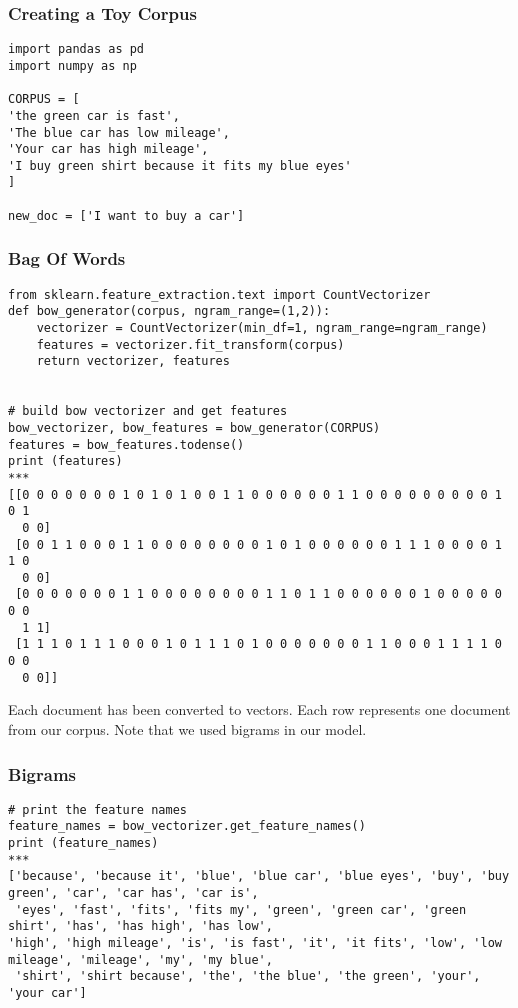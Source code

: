 \begin{frame}[fragile]\frametitle{Creating a Toy Corpus}
\begin{lstlisting}
import pandas as pd
import numpy as np

CORPUS = [
'the green car is fast',
'The blue car has low mileage',
'Your car has high mileage',
'I buy green shirt because it fits my blue eyes'
]

new_doc = ['I want to buy a car']
\end{lstlisting}
\end{frame}


\begin{frame}[fragile]\frametitle{Bag Of Words}
\begin{lstlisting}
from sklearn.feature_extraction.text import CountVectorizer
def bow_generator(corpus, ngram_range=(1,2)):
    vectorizer = CountVectorizer(min_df=1, ngram_range=ngram_range)
    features = vectorizer.fit_transform(corpus)
    return vectorizer, features


# build bow vectorizer and get features
bow_vectorizer, bow_features = bow_generator(CORPUS)
features = bow_features.todense()
print (features)
***
[[0 0 0 0 0 0 0 1 0 1 0 1 0 0 1 1 0 0 0 0 0 0 1 1 0 0 0 0 0 0 0 0 0 1 0 1
  0 0]
 [0 0 1 1 0 0 0 1 1 0 0 0 0 0 0 0 0 1 0 1 0 0 0 0 0 0 1 1 1 0 0 0 0 1 1 0
  0 0]
 [0 0 0 0 0 0 0 1 1 0 0 0 0 0 0 0 0 1 1 0 1 1 0 0 0 0 0 0 1 0 0 0 0 0 0 0
  1 1]
 [1 1 1 0 1 1 1 0 0 0 1 0 1 1 1 0 1 0 0 0 0 0 0 0 1 1 0 0 0 1 1 1 1 0 0 0
  0 0]]
\end{lstlisting}
Each document has been converted to vectors. Each row represents one document from our corpus. Note that we used bigrams in our model.
\end{frame}


\begin{frame}[fragile]\frametitle{Bigrams}
\begin{lstlisting}
# print the feature names
feature_names = bow_vectorizer.get_feature_names()
print (feature_names)
***
['because', 'because it', 'blue', 'blue car', 'blue eyes', 'buy', 'buy green', 'car', 'car has', 'car is',
 'eyes', 'fast', 'fits', 'fits my', 'green', 'green car', 'green shirt', 'has', 'has high', 'has low', 
'high', 'high mileage', 'is', 'is fast', 'it', 'it fits', 'low', 'low mileage', 'mileage', 'my', 'my blue',
 'shirt', 'shirt because', 'the', 'the blue', 'the green', 'your', 'your car']
\end{lstlisting}

\end{frame}

